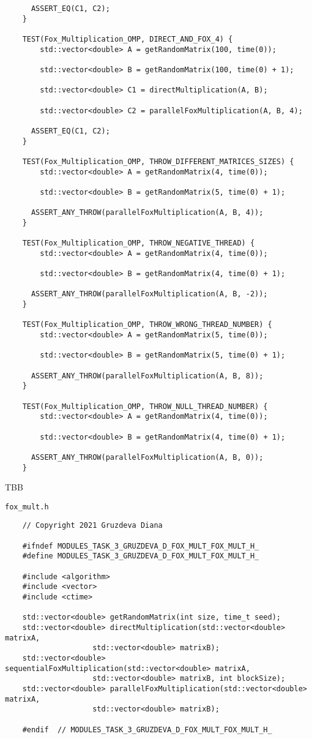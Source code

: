 \documentclass{article}
\begin{document}
\begin{lstlisting}
  	  ASSERT_EQ(C1, C2);
	}

	TEST(Fox_Multiplication_OMP, DIRECT_AND_FOX_4) {
    	std::vector<double> A = getRandomMatrix(100, time(0));

    	std::vector<double> B = getRandomMatrix(100, time(0) + 1);

    	std::vector<double> C1 = directMultiplication(A, B);

    	std::vector<double> C2 = parallelFoxMultiplication(A, B, 4);

  	  ASSERT_EQ(C1, C2);
	}

	TEST(Fox_Multiplication_OMP, THROW_DIFFERENT_MATRICES_SIZES) {
    	std::vector<double> A = getRandomMatrix(4, time(0));

    	std::vector<double> B = getRandomMatrix(5, time(0) + 1);

  	  ASSERT_ANY_THROW(parallelFoxMultiplication(A, B, 4));
	}

	TEST(Fox_Multiplication_OMP, THROW_NEGATIVE_THREAD) {
    	std::vector<double> A = getRandomMatrix(4, time(0));

    	std::vector<double> B = getRandomMatrix(4, time(0) + 1);

  	  ASSERT_ANY_THROW(parallelFoxMultiplication(A, B, -2));
	}

	TEST(Fox_Multiplication_OMP, THROW_WRONG_THREAD_NUMBER) {
    	std::vector<double> A = getRandomMatrix(5, time(0));

    	std::vector<double> B = getRandomMatrix(5, time(0) + 1);

  	  ASSERT_ANY_THROW(parallelFoxMultiplication(A, B, 8));
	}

	TEST(Fox_Multiplication_OMP, THROW_NULL_THREAD_NUMBER) {
    	std::vector<double> A = getRandomMatrix(4, time(0));

    	std::vector<double> B = getRandomMatrix(4, time(0) + 1);

  	  ASSERT_ANY_THROW(parallelFoxMultiplication(A, B, 0));
	}

\end{lstlisting}
\par
TBB
\par
\lstinline$fox_mult.h$
\begin{lstlisting}
	// Copyright 2021 Gruzdeva Diana

	#ifndef MODULES_TASK_3_GRUZDEVA_D_FOX_MULT_FOX_MULT_H_
	#define MODULES_TASK_3_GRUZDEVA_D_FOX_MULT_FOX_MULT_H_

	#include <algorithm>
	#include <vector>
	#include <ctime>

	std::vector<double> getRandomMatrix(int size, time_t seed);
	std::vector<double> directMultiplication(std::vector<double> matrixA,
                    std::vector<double> matrixB);
	std::vector<double> sequentialFoxMultiplication(std::vector<double> matrixA,
                    std::vector<double> matrixB, int blockSize);
	std::vector<double> parallelFoxMultiplication(std::vector<double> matrixA,
                    std::vector<double> matrixB);

	#endif  // MODULES_TASK_3_GRUZDEVA_D_FOX_MULT_FOX_MULT_H_
\end{lstlisting}
\end{document}
